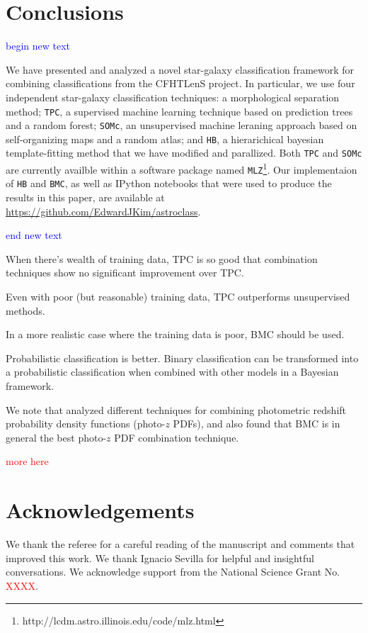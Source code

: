 \documentclass[useAMS,usenatbib]{mn2e}
\begin{document}
\section{Conclusions}
  \label{section:conclusions}

\textcolor{blue}{begin new text}

We have presented and analyzed a novel star-galaxy classification framework
for combining classifications from the CFHTLenS project.
In particular, we use four independent star-galaxy classification techniques:
a morphological separation method;
\texttt{TPC}, a supervised machine learning technique
based on prediction trees and a random forest;
\texttt{SOMc}, an unsupervised machine leraning approach
based on self-organizing maps and a random atlas;
and \texttt{HB}, a hierarichical bayesian template-fitting method
that we have modified and parallized.
Both \texttt{TPC} and \texttt{SOMc} are currently availble within
a software package named
\texttt{MLZ}\footnote{http://lcdm.astro.illinois.edu/code/mlz.html}.
Our implementaion of \texttt{HB} and \texttt{BMC},
as well as IPython notebooks that were used to
produce the results in this paper,
are available at \url{https://github.com/EdwardJKim/astroclass}.

\textcolor{blue}{end new text}

When there's wealth of training data,
TPC is so good that combination techniques show
no significant improvement over TPC.

Even with poor (but reasonable) training data,
TPC outperforms unsupervised methods.

In a more realistic case where the training data is poor,
BMC should be used.

Probabilistic classification is better.
Binary classification can be transformed into a probabilistic
classification when combined with other models in a Bayesian framework.

We note that \cite{carrascokind2014exhausting} analyzed
different techniques for combining
photometric redshift probability density functions (photo-$z$ PDFs),
and also found that BMC is in general the best
photo-$z$ PDF combination technique.

\textcolor{red}{more here}

\section*{Acknowledgements}

We thank the referee for a careful reading of the manuscript
and comments that improved this work.
We thank Ignacio Sevilla for helpful and insightful conversations.
We acknowledge support from the National Science Grant No.
\textcolor{red}{XXXX}.
\end{document}
